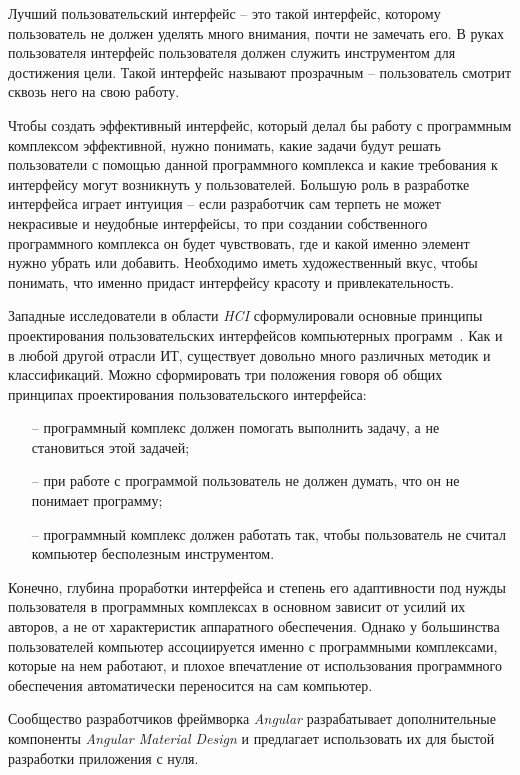 Лучший пользовательский интерфейс – это такой интерфейс, которому
пользователь не должен уделять много внимания, почти не замечать его. В руках
пользователя интерфейс пользователя должен служить инструментом для
достижения цели. Такой интерфейс называют прозрачным – пользователь
смотрит сквозь него на свою работу.

Чтобы создать эффективный интерфейс, который делал бы работу с
программным комплексом эффективной, нужно понимать, какие задачи будут
решать пользователи с помощью данной программного комплекса и какие
требования к интерфейсу могут возникнуть у пользователей. Большую роль в
разработке интерфейса играет интуиция – если разработчик сам терпеть не
может некрасивые и неудобные интерфейсы, то при создании собственного
программного комплекса он будет чувствовать, где и какой именно элемент
нужно убрать или добавить. Необходимо иметь художественный вкус, чтобы
понимать, что именно придаст интерфейсу красоту и привлекательность.

Западные исследователи в области \textit{HCI} сформулировали основные
принципы проектирования пользовательских интерфейсов компьютерных
программ~\cite{user-interface}. Как и в любой другой отрасли ИТ, существует довольно много
различных методик и классификаций. Можно сформировать три положения
говоря об общих принципах проектирования пользовательского интерфейса:

\begin{enumerate}
	\item[--] программный комплекс должен помогать выполнить задачу, а не
	становиться этой задачей;
	\item[--] при работе с программой пользователь не должен думать, что он не
	понимает программу;

	\item[--] программный комплекс должен работать так, чтобы пользователь не
	считал компьютер бесполезным инструментом.
\end{enumerate}

Конечно, глубина проработки интерфейса и степень его адаптивности под
нужды пользователя в программных комплексах в основном зависит от усилий
их авторов, а не от характеристик аппаратного обеспечения. Однако у
большинства пользователей компьютер ассоциируется именно с программными
комплексами, которые на нем работают, и плохое впечатление от использования
программного обеспечения автоматически переносится на сам компьютер.

Сообщество разработчиков фреймворка \textit{Angular} разрабатывает дополнительные компоненты \textit{Angular Material Design} и предлагает использовать их для быстой разработки приложения с нуля. 

